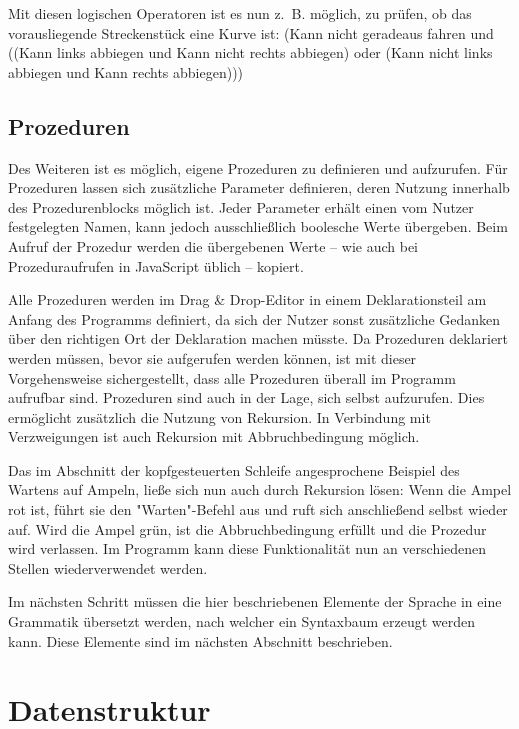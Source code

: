 Mit diesen logischen Operatoren ist es nun z.~B. möglich, zu prüfen, ob das vorausliegende Streckenstück eine Kurve ist: (Kann nicht geradeaus fahren und ((Kann links abbiegen und Kann nicht rechts abbiegen) oder (Kann nicht links abbiegen und Kann rechts abbiegen)))

\subsection*{Prozeduren}
\label{sec:implementation:elements:proc}

Des Weiteren ist es möglich, eigene Prozeduren zu definieren und aufzurufen. Für Prozeduren lassen sich zusätzliche Parameter definieren, deren Nutzung innerhalb des Prozedurenblocks möglich ist. Jeder Parameter erhält einen vom Nutzer festgelegten Namen, kann jedoch ausschließlich boolesche Werte übergeben. Beim Aufruf der Prozedur werden die übergebenen Werte -- wie auch bei Prozeduraufrufen in JavaScript üblich -- kopiert.

Alle Prozeduren werden im Drag \& Drop-Editor in einem Deklarationsteil am Anfang des Programms definiert, da sich der Nutzer sonst zusätzliche Gedanken über den richtigen Ort der Deklaration machen müsste. Da Prozeduren deklariert werden müssen, bevor sie aufgerufen werden können, ist mit dieser Vorgehensweise sichergestellt, dass alle Prozeduren überall im Programm aufrufbar sind. Prozeduren sind auch in der Lage, sich selbst aufzurufen. Dies ermöglicht zusätzlich die Nutzung von Rekursion. In Verbindung mit Verzweigungen ist auch Rekursion mit Abbruchbedingung möglich.

Das im Abschnitt der kopfgesteuerten Schleife angesprochene Beispiel des Wartens auf Ampeln, ließe sich nun auch durch Rekursion lösen: Wenn die Ampel rot ist, führt sie den "Warten"-Befehl aus und ruft sich anschließend selbst wieder auf. Wird die Ampel grün, ist die Abbruchbedingung erfüllt und die Prozedur wird verlassen. Im Programm kann diese Funktionalität nun an verschiedenen Stellen wiederverwendet werden.

Im nächsten Schritt müssen die hier beschriebenen Elemente der Sprache in eine Grammatik übersetzt werden, nach welcher ein Syntaxbaum erzeugt werden kann. Diese Elemente sind im nächsten Abschnitt beschrieben.

\section{Datenstruktur}
\label{sec:implementation:datastructure}

